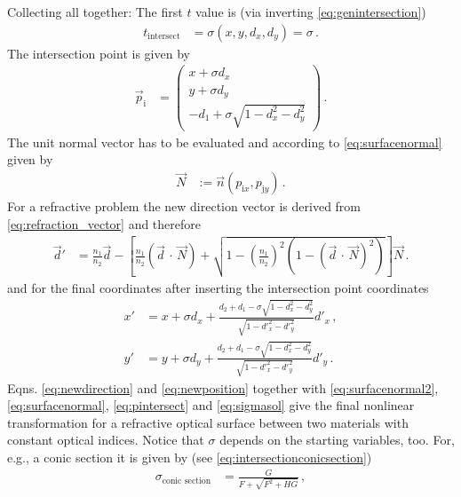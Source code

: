 \documentclass[12pt,a4paper,twoside,openright,BCOR10mm,headsepline,titlepage,abstracton,chapterprefix,final]{scrreprt}
\newcommand{\scpm}[2]{(#1\,\cdot\,#2)}
\begin{document}
Collecting all together: The first $t$ value is (via inverting \eqref{eq:genintersection})
\begin{align}
 t_\text{intersect} &= \sigma(x, y, d_x, d_y) = \sigma\,.\label{eq:sigmasol}
\end{align}
The intersection point is given by
\begin{align}
 \vec{p}_\text{i} &= \begin{pmatrix} x + \sigma d_x \\ y + \sigma d_y \\ -d_1 + \sigma \sqrt{1 - d_x^2 - d_y^2} \end{pmatrix}\,.\label{eq:pintersect}
\end{align}
The unit normal vector has to be evaluated and according to \eqref{eq:surfacenormal} given by
\begin{align}
 \vec{N} &:= \vec{n}(p_{\text{i}x}, p_{\text{j}y})\,.\label{eq:surfacenormal2}
\end{align}
For a refractive problem the new direction vector is derived from \eqref{eq:refraction_vector} and therefore
\begin{align}
 \vec{d}' &= \frac{n_1}{n_2} \vec{d} 
 - \left[\frac{n_1}{n_2} \scpm{\vec{d}}{\vec{N}} 
      + \sqrt{1 - \left(\frac{n_1}{n_2}\right)^2 (1 - {\scpm{\vec{d}}{\vec{N}}}^2)}\right] \vec{N}\,.\label{eq:newdirection}
\end{align}
and for the final coordinates after inserting the intersection point coordinates
\begin{subequations}
\label{eq:newposition}
\begin{align}
 x' &= x + \sigma d_x + \frac{d_2 + d_1 - \sigma \sqrt{1 - d_x^2 - d_y^2}}{\sqrt{1 - {d'}_x^2 - {d'}_y^2}} {d'}_x\,,\\
 y' &= y + \sigma d_y + \frac{d_2 + d_1 - \sigma \sqrt{1 - d_x^2 - d_y^2}}{\sqrt{1 - {d'}_x^2 - {d'}_y^2}} {d'}_y\,.
\end{align}
\end{subequations}
Eqns. \eqref{eq:newdirection} and \eqref{eq:newposition} together with \eqref{eq:surfacenormal2}, \eqref{eq:surfacenormal},
\eqref{eq:pintersect} and \eqref{eq:sigmasol} give the final nonlinear transformation for a refractive optical surface between
two materials with constant optical indices. Notice that $\sigma$ depends on the starting variables, too.  
For, e.g., a conic section it is given by (see \eqref{eq:intersectionconicsection})
\begin{align}
 \sigma_{\text{conic section}} &= \frac{G}{ F + \sqrt{F^2 + H G} }\,,
\end{align}
\end{document}
